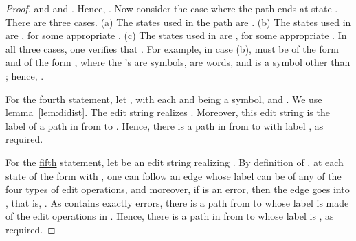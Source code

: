 \documentclass{article}
\theoremstyle{plain}
\theoremstyle{definition}
\theoremstyle{remark}
\begin{document}
\begin{proof}
and  and .
Hence, . Now consider the case where the path  ends at state .
There are three cases. (a) The states used in the path are .
(b) The states used in  are , for some appropriate .
(c)  The states used in  are , for some appropriate .
In all three cases, one verifies that . For example, in case (b),  must be of the form
 and  of the form , where the
's are symbols,  are words, and  is a symbol other than ; hence,
.
\par
For the \underline{fourth} statement, let , with each  and  being a symbol,
and .
We use lemma~\ref{lem:didist}.
The edit string 
realizes . Moreover, this edit string is the label of a path in  from
 to . Hence, there is a path
in  from  to  with
label , as required.
\par
For the \underline{fifth} statement, let  be an edit string realizing . By definition
of , at each state of the form  with , one can follow an edge whose
label  can be of any of the
four types of edit operations, and moreover, if  is an error, then the edge goes into ,
that is, .
As  contains exactly  errors, there is a path from  to  whose label is made of the edit operations in . Hence, there is a path in  from  to  whose label is , as required.
\end{proof}
\end{document}
